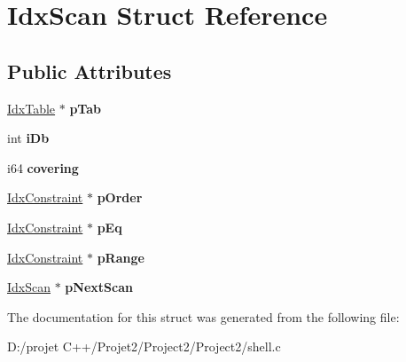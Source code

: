 \hypertarget{struct_idx_scan}{}\section{Idx\+Scan Struct Reference}
\label{struct_idx_scan}
\subsection*{Public Attributes}
\begin{DoxyCompactItemize}
\item 
\mbox{\label{struct_idx_scan_aeff2ae385cf81a754ba024008784ce9f}} 
\mbox{\hyperlink{struct_idx_table}{Idx\+Table}} $\ast$ {\bfseries p\+Tab}
\item 
\mbox{\label{struct_idx_scan_a9fef43264e8c02527cf5c739e2901584}} 
int {\bfseries i\+Db}
\item 
\mbox{\label{struct_idx_scan_acb8584f5c71aecd7406fffad5b071fec}} 
i64 {\bfseries covering}
\item 
\mbox{\label{struct_idx_scan_afdf1d4788c12c99bbff6985863d78025}} 
\mbox{\hyperlink{struct_idx_constraint}{Idx\+Constraint}} $\ast$ {\bfseries p\+Order}
\item 
\mbox{\label{struct_idx_scan_a5f4492e514791d4afee9c7e7497ad418}} 
\mbox{\hyperlink{struct_idx_constraint}{Idx\+Constraint}} $\ast$ {\bfseries p\+Eq}
\item 
\mbox{\label{struct_idx_scan_aaa7bd865b25da20e42d06484b060a44e}} 
\mbox{\hyperlink{struct_idx_constraint}{Idx\+Constraint}} $\ast$ {\bfseries p\+Range}
\item 
\mbox{\label{struct_idx_scan_a32739c9479607c68bb0f8b297838be18}} 
\mbox{\hyperlink{struct_idx_scan}{Idx\+Scan}} $\ast$ {\bfseries p\+Next\+Scan}
\end{DoxyCompactItemize}


The documentation for this struct was generated from the following file\+:\begin{DoxyCompactItemize}
\item 
D\+:/projet C++/\+Projet2/\+Project2/\+Project2/shell.\+c\end{DoxyCompactItemize}
